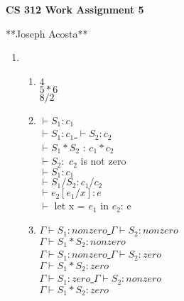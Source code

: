 \documentclass[11pt]{article}
\begin{document}
\begin{center}             %
\begin{LARGE}
{\bf CS 312 Work Assignment 5}
\end{LARGE}
\vskip 0.25cm      %

**Joseph Acosta**\\
\end{center}

\begin{enumerate}

\item
\begin{enumerate}
\item $4$\\
	  $5*6$\\
	  $8/2$\\
\item $\vdash S_1:c_1$\\

		\underline{$\vdash S_1:c_1$ \hspace{12} $\vdash S_2:c_2$}\\
		$\vdash S_1*S_2$ : $c_1*c_2$\\
		
		$\vdash S_2:$ $c_2$ is not zero\\
		\underline{$\vdash S_1:c_1$}\\
		$\vdash S_1/S_2 : c_1/c_2$\\
		
		\underline{$\vdash e_2[e_1/x]:e$}\\
		$\vdash$ let x = $e_1$ in $e_2$: e\\
		
\item \underline{$\Gamma\vdash S_1:non zero$ \hspace{12} $\Gamma\vdash S_2:non zero$}\\
		$\Gamma\vdash S_1*S_2:non zero$\\
		
		\underline{$\Gamma\vdash S_1:non zero$ \hspace{12} $\Gamma\vdash S_2:zero$}\\
		$\Gamma\vdash S_1*S_2:zero$\\
		
		\underline{$\Gamma\vdash S_1:zero$ \hspace{12} $\Gamma\vdash S_2:non zero$}\\
		$\Gamma\vdash S_1*S_2:zero$\\
		

\end{enumerate}
\end{enumerate}
\end{document}
